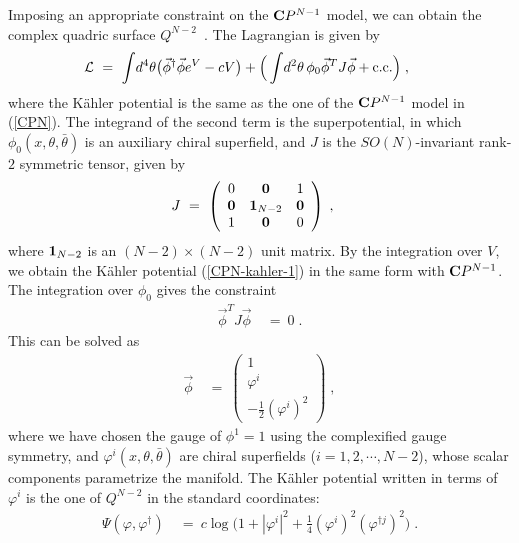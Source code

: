 \documentclass[a4paper,11pt]{article}
\newcommand{\half}{\frac{1}{2}}
\newcommand{\kahler}{K\"{a}hler }
\begin{document}
{Imposing an appropriate constraint on the ${\bf C}P^{N-1}$ model, 
we can obtain the complex quadric surface
$Q^{N-2}$~\cite{HN1,HN2,HKNT}. 
The Lagrangian is given by 
\begin{align}
{\cal L} 
\ &= \ 
\int \! d^4 \theta
\big( \vec{\phi}^{\dagger} \vec{\phi} e^V - c V \big) 
+ \Big( 
\int \! d^2 \theta \, \phi_0 \vec{\phi}^T J \vec{\phi} + \mbox{c.c.} 
\Big) \; , \ \ \  \label{Lagrangian-Q}
\end{align}
where the \kahler potential 
is the same as the one of 
the ${\bf C}P^{N-1}$ model in (\ref{CPN}).
The integrand of the second term is 
the superpotential, in which 
$\phi_0 (x, \theta , \bar{\theta})$ is 
an auxiliary chiral superfield, 
and $J$ is the $SO(N)$-invariant 
rank-$2$ symmetric tensor, given by 
\begin{align}
J \ &= \ \left(
\begin{array}{ccc}
0 & {\bf 0} & 1 \\
{\bf 0} & {\bf 1}_{N-2} & {\bf 0} \\
1 & {\bf 0} & 0 
\end{array} \right) \; ,
\end{align}
where ${\bf 1}_{N-2}$ is an
$(N-2) \times (N-2)$ unit matrix.
By the integration over $V$, 
we obtain the \kahler potential (\ref{CPN-kahler-1}) 
in the same form with ${\bf C}P^{N-1}$. 
The integration over $\phi_0$ gives the constraint 
\begin{align}
\vec{\phi}^T J \vec{\phi} \ &= \ 0 \; . \label{F-con}
\end{align}
This can be solved as  
\begin{align}
\vec{\phi} \ &= \ \left(
\begin{array}{c}
1 \\
\varphi^i \\
- \half (\varphi^i)^2
\end{array} \right) \; , \label{QN-sol}
\end{align}
where we have chosen the gauge of $\phi^1 = 1$ 
using the complexified gauge symmetry, and 
$\varphi^i (x, \theta, \bar{\theta})$ are chiral superfields ($i
= 1, 2, \cdots, N-2$), 
whose scalar components parametrize the manifold. 
The \kahler potential written in terms of $\varphi^i$ is 
the one of $Q^{N-2}$ in the standard coordinates:  
\begin{align}
\Psi (\varphi, \varphi^{\dagger}) 
\ &= \ 
c \log \Big( 
1 + |\varphi^i|^2 + \frac{1}{4} (\varphi^i)^2 
(\varphi^{\dagger j})^2 
\Big) \; . \label{Q-Kahler}
\end{align}

}
\end{document}
